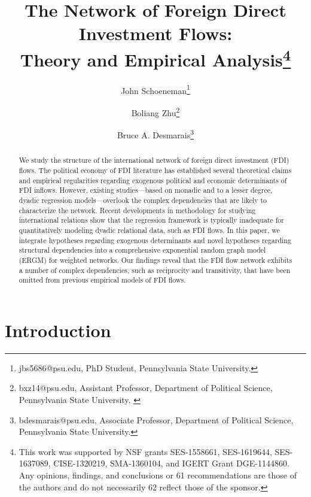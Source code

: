 \documentclass{article}
\begin{document}
\title{The Network of Foreign Direct Investment Flows: \\Theory and Empirical Analysis\footnote{This work was supported by NSF grants SES-1558661, SES-1619644, SES-1637089, CISE-1320219, SMA-1360104, and IGERT Grant DGE-1144860. Any opinions, findings, and conclusions or 61 recommendations are those of the authors and do not necessarily 62 reflect those of the sponsor.}}
\author{John  Schoeneman\thanks{\footnotesize{
jbs5686@psu.edu, PhD Student, Pennsylvania State University.}} \and Boliang Zhu\thanks{\footnotesize{bxz14@psu.edu, Assistant Professor, Department of Political Science, Pennsylvania State University. }} \and Bruce A. Desmarais\thanks{\footnotesize{
bdesmarais@psu.edu, Associate Professor, Department of Political Science, Pennsylvania State University.}}}
\date{}
\maketitle

\singlespacing
\begin{abstract}
    \noindent We study the structure of the international network of foreign direct investment (FDI) flows. The political economy of FDI literature has established several theoretical claims and empirical regularities regarding exogenous political and economic determinants of FDI inflows. %
    However, existing studies---based on monadic and to a lesser degree, dyadic regression models---overlook the complex dependencies that are likely to characterize the network. Recent developments in methodology for studying international relations show that the regression framework is typically inadequate for quantitatively modeling dyadic relational data, such as FDI flows. In this paper, we integrate hypotheses regarding exogenous determinants and novel hypotheses regarding structural dependencies into a comprehensive exponential random graph model (ERGM) for weighted networks. Our findings reveal that the FDI flow network  exhibits a number of complex dependencies, such as reciprocity and transitivity, that have been omitted from previous empirical models of FDI flows.

\end{abstract}

\clearpage
\doublespacing
\section{Introduction}
\end{document}
